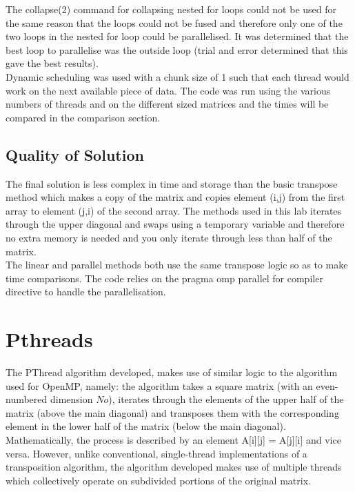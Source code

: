 \documentclass[journal, a4paper]{IEEEtran}
\begin{document}
The collapse(2) command for collapsing nested for loops could not be used for the same reason that the loops could not be fused and therefore only one of the two loops in the nested for loop could be parallelised. It was determined that the best loop to parallelise was the outside loop (trial and error determined that this gave the best results). \\

Dynamic scheduling was used with a chunk size of 1 such that each thread would work on the next available piece of data. The code was run using the various numbers of threads and on the different sized matrices and the times will be compared in the comparison section. \\

\subsection{Quality of Solution}
The final solution is less complex in time and storage than the basic transpose method which makes a copy of the matrix and copies element (i,j) from the first array to element (j,i) of the second array. The methods used in this lab iterates through the upper diagonal and swaps using a temporary variable and therefore no extra memory is needed and you only iterate through less than half of the matrix. \\

The linear and parallel methods both use the same transpose logic so as to make time comparisons. The code relies on the pragma omp parallel for compiler directive to handle the parallelisation. 

\section{Pthreads}

\noindent
The PThread algorithm developed, makes use of similar logic to the algorithm used for OpenMP, namely: the algorithm takes a square matrix (with an even-numbered dimension $No$), iterates through the elements of the upper half of the matrix (above the main diagonal) and transposes them with the corresponding element in the lower half of the matrix (below the main diagonal). Mathematically, the process is described by an element A[i][j] = A[j][i] and vice versa. However, unlike conventional, single-thread implementations of a transposition algorithm, the algorithm developed makes use of multiple threads which collectively operate on subdivided portions of the original matrix.\\
\end{document}
